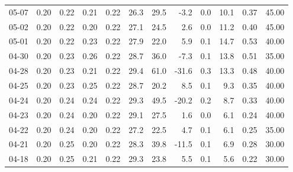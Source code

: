\begin{threeparttable}
{\begin{tabular}{lrrrrrrrrrrr}
  05-07 &          0.20 &          0.22 &          0.21 &        0.22 &                26.3 &                29.5 &       -3.2 &                 0.0 &             10.1 &            0.37 &                  45.00 \\
  05-02 &          0.20 &          0.22 &          0.20 &        0.22 &                27.1 &                24.5 &        2.6 &                 0.0 &             11.2 &            0.40 &                  45.00 \\
  05-01 &          0.20 &          0.22 &          0.23 &        0.22 &                27.9 &                22.0 &        5.9 &                 0.1 &             14.7 &            0.53 &                  40.00 \\
  04-30 &          0.20 &          0.23 &          0.26 &        0.22 &                28.7 &                36.0 &       -7.3 &                 0.1 &             13.8 &            0.51 &                  35.00 \\
  04-28 &          0.20 &          0.23 &          0.21 &        0.22 &                29.4 &                61.0 &      -31.6 &                 0.3 &             13.3 &            0.48 &                  40.00 \\
  04-25 &          0.20 &          0.23 &          0.25 &        0.22 &                28.7 &                20.2 &        8.5 &                 0.1 &              9.3 &            0.35 &                  40.00 \\
  04-24 &          0.20 &          0.24 &          0.24 &        0.22 &                29.3 &                49.5 &      -20.2 &                 0.2 &              8.7 &            0.33 &                  40.00 \\
  04-23 &          0.20 &          0.24 &          0.20 &        0.22 &                29.1 &                27.5 &        1.6 &                 0.0 &              6.1 &            0.24 &                  40.00 \\
  04-22 &          0.20 &          0.24 &          0.20 &        0.22 &                27.2 &                22.5 &        4.7 &                 0.1 &              6.1 &            0.25 &                  35.00 \\
  04-21 &          0.20 &          0.25 &          0.20 &        0.22 &                28.3 &                39.8 &      -11.5 &                 0.1 &              6.9 &            0.28 &                  30.00 \\
  04-18 &          0.20 &          0.25 &          0.21 &        0.22 &                29.3 &                23.8 &        5.5 &                 0.1 &              5.6 &            0.22 &                  30.00 \\

\end{tabular}}
\end{threeparttable}
